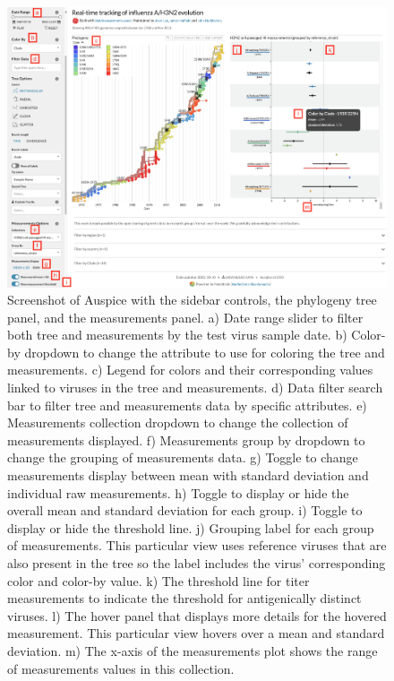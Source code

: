 \documentclass[utf8]{FrontiersinHarvard} %
\begin{document}
\begin{figure}[h!]
  \begin{center}
    \includegraphics[width=\textwidth]{figures/figure-2-screen-shot}
  \end{center}
  \caption{
    Screenshot of Auspice with the sidebar controls, the phylogeny tree panel, and the measurements panel.
a) Date range slider to filter both tree and measurements by the test virus sample date.
b) Color-by dropdown to change the attribute to use for coloring the tree and measurements.
c) Legend for colors and their corresponding values linked to viruses in the tree and measurements.
d) Data filter search bar to filter tree and measurements data by specific attributes.
e) Measurements collection dropdown to change the collection of measurements displayed.
f) Measurements group by dropdown to change the grouping of measurements data.
g) Toggle to change measurements display between mean with standard deviation and individual raw measurements.
h) Toggle to display or hide the overall mean and standard deviation for each group.
i) Toggle to display or hide the threshold line.
j) Grouping label for each group of measurements.
This particular view uses reference viruses that are also present in the tree so the label includes the virus' corresponding color and color-by value.
k) The threshold line for titer measurements to indicate the threshold for antigenically distinct viruses.
l) The hover panel that displays more details for the hovered measurement.
This particular view hovers over a mean and standard deviation.
m) The x-axis of the measurements plot shows the range of measurements values in this collection.
  }\label{fig:2}
\end{figure}
\end{document}
